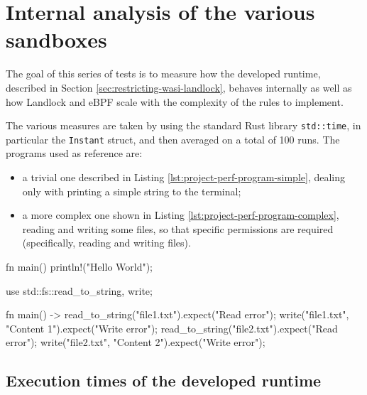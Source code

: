 \clearpage

\section{Internal analysis of the various sandboxes}
\label{sec:performance-internal-analysis}

The goal of this series of tests is to measure how the developed runtime,
described in Section \ref{sec:restricting-wasi-landlock}, behaves internally
as well as how Landlock and eBPF scale with the complexity of the rules
to implement.

The various measures are taken by using the standard Rust library \texttt{std::time},
in particular the \texttt{Instant} struct, and then averaged on a total of 100 runs.
The programs used as reference are:
\begin{itemize}
  \item a trivial one described in Listing \ref{lst:project-perf-program-simple},
        dealing only with printing a simple string to the terminal;
  \item a more complex one shown in Listing \ref{lst:project-perf-program-complex},
        reading and writing some files, so that specific permissions are required
        (specifically, reading and writing files).
\end{itemize}

\vspace*{0.5cm}

\begin{code}[language=Rust, caption=The trivial program., label=lst:project-perf-program-simple]
fn main() {
  println!("Hello World");
}
\end{code}

\begin{code}[language=Rust, caption=The more complex program., label=lst:project-perf-program-complex]
use std::fs::{read_to_string, write};

fn main() -> {
  read_to_string("file1.txt").expect("Read error");
  write("file1.txt", "Content 1").expect("Write error");
  read_to_string("file2.txt").expect("Read error");
  write("file2.txt", "Content 2").expect("Write error");
}  
\end{code}

\clearpage
\subsection{Execution times of the developed runtime}
\label{sec:performance-internal-analysis-execution-times}

